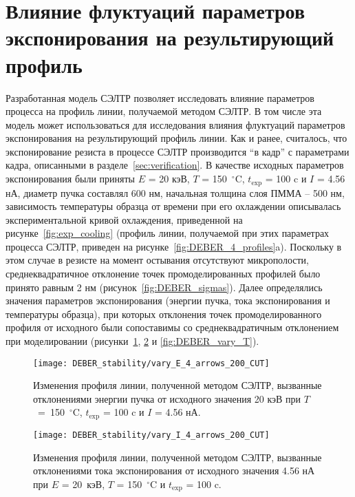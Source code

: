 \section{Влияние флуктуаций параметров экспонирования на результирующий профиль}

Разработанная модель СЭЛТР позволяет исследовать влияние параметров процесса на профиль линии, получаемой методом СЭЛТР.
В том числе эта модель может использоваться для исследования влияния флуктуаций параметров экспонирования на результирующий профиль линии.
Как и ранее, считалось, что экспонирование резиста в процессе СЭЛТР производится \linebreak ``в кадр'' с параметрами кадра, описанными в разделе~\ref{sec:verification}.
В качестве исходных параметров экспонирования были приняты $E$ = 20 кэВ, $T$ = 150~$^\circ$C, $t_\mathrm{exp}$ = 100 c и \linebreak $I$ = 4.56 нА, диаметр пучка составлял 600 нм, начальная толщина слоя ПММА -- 500 нм, зависимость температуры образца от времени при его охлаждении описывалась экспериментальной кривой охлаждения, приведенной на рисунке~\ref{fig:exp_cooling} (профиль линии, получаемой при этих параметрах процесса СЭЛТР, приведен на рисунке~\ref{fig:DEBER_4_profiles}a).
Поскольку в этом случае в резисте на момент остывания отсутствуют микрополости, среднеквадратичное отклонение точек промоделированных профилей было принято равным 2 нм (рисунок~\ref{fig:DEBER_sigmas}).
Далее определялись значения параметров экспонирования (энергии пучка, тока экспонирования и температуры образца), при которых отклонения точек промоделированного профиля от исходного были сопоставимы со среднеквадратичным отклонением при моделировании (рисунки~\ref{fig:DEBER_vary_E}, \ref{fig:DEBER_vary_I} и \ref{fig:DEBER_vary_T}).

\begin{figure}[h!]
	\begin{center}
		\texttt{[image: DEBER\_stability/vary\_E\_4\_arrows\_200\_CUT]}
	\end{center}
	\caption{Изменения профиля линии, полученной методом СЭЛТР, вызванные отклонениями энергии пучка от исходного значения 20 кэВ при $T$~=~150~$^\circ$C, $t_\mathrm{exp}$ = 100 c и $I$ = 4.56 нА.}
	\label{fig:DEBER_vary_E}
\end{figure}

\begin{figure}[h!]
	\begin{center}
		\texttt{[image: DEBER\_stability/vary\_I\_4\_arrows\_200\_CUT]}
	\end{center}
	\caption{Изменения профиля линии, полученной методом СЭЛТР, вызванные отклонениями тока экспонирования от исходного значения 4.56 нА при $E$ = 20~кэВ, $T$ = 150~$^\circ$C и $t_\mathrm{exp}$ = 100 c.}
	\label{fig:DEBER_vary_I}
\end{figure}

